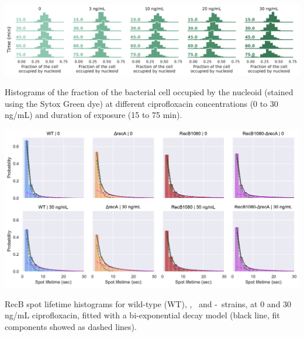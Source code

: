 \begin{suppfigure*}[htbp]
    \begin{center}
    \includegraphics[width=\textwidth]{SI_Figures/Nucleoid_compaction.pdf}
    \end{center}
    \caption{Histograms of the fraction of the bacterial cell occupied by the nucleoid (stained using the Sytox Green dye) at different ciprofloxacin concentrations (0 to 30 ng/mL) and duration of exposure (15 to 75 min).}
    \label{SIFig:nucleoid_compaction}
\end{suppfigure*}

\begin{suppfigure*}[htbp]
    \begin{center}
    \includegraphics[width=.8\textwidth]{SI_Figures/Mutants_RecB_fits.pdf}
    \end{center}
    \caption{RecB spot lifetime histograms for wild-type (WT), \dreca, \teneighty\ and \teneighty -\dreca\ strains, at 0 and 30 ng/mL ciprofloxacin, fitted with a bi-exponential decay model (black line, fit components showed as dashed lines).}
    \label{SIFig:mutants_biexp_fits}
\end{suppfigure*}
